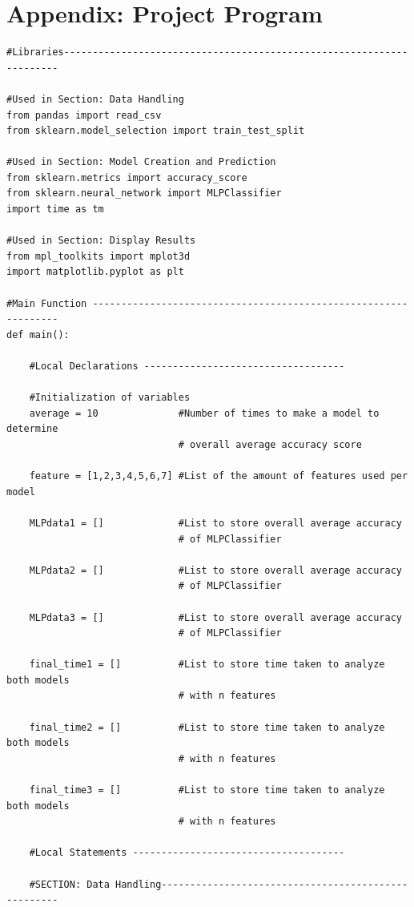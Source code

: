 \documentclass[a4paper, 12pt]{article}
\begin{document}
\newpage
\section{Appendix: Project Program}

\begin{lstlisting}[frame = single]
#Libraries---------------------------------------------------------------------

#Used in Section: Data Handling
from pandas import read_csv
from sklearn.model_selection import train_test_split

#Used in Section: Model Creation and Prediction
from sklearn.metrics import accuracy_score
from sklearn.neural_network import MLPClassifier
import time as tm

#Used in Section: Display Results
from mpl_toolkits import mplot3d
import matplotlib.pyplot as plt

#Main Function ----------------------------------------------------------------
def main():

    #Local Declarations -----------------------------------

    #Initialization of variables
    average = 10              #Number of times to make a model to determine
                              # overall average accuracy score

    feature = [1,2,3,4,5,6,7] #List of the amount of features used per model

    MLPdata1 = []             #List to store overall average accuracy
                              # of MLPClassifier

    MLPdata2 = []             #List to store overall average accuracy
                              # of MLPClassifier

    MLPdata3 = []             #List to store overall average accuracy
                              # of MLPClassifier

    final_time1 = []          #List to store time taken to analyze both models
                              # with n features

    final_time2 = []          #List to store time taken to analyze both models
                              # with n features

    final_time3 = []          #List to store time taken to analyze both models
                              # with n features
    
    #Local Statements -------------------------------------

    #SECTION: Data Handling----------------------------------------------------


\end{lstlisting}
\end{document}

